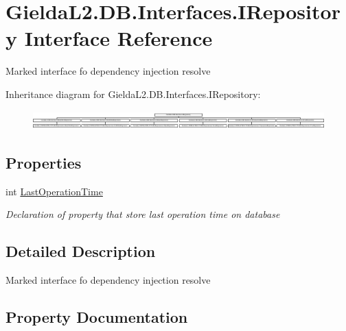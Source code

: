 \hypertarget{interface_gielda_l2_1_1_d_b_1_1_interfaces_1_1_i_repository}{}\section{Gielda\+L2.\+D\+B.\+Interfaces.\+I\+Repository Interface Reference}
\label{interface_gielda_l2_1_1_d_b_1_1_interfaces_1_1_i_repository}


Marked interface fo dependency injection resolve  


Inheritance diagram for Gielda\+L2.\+D\+B.\+Interfaces.\+I\+Repository\+:\begin{figure}[H]
\begin{center}
\leavevmode
\includegraphics[height=0.727273cm]{interface_gielda_l2_1_1_d_b_1_1_interfaces_1_1_i_repository}
\end{center}
\end{figure}
\subsection*{Properties}
\begin{DoxyCompactItemize}
\item 
int \mbox{\hyperlink{interface_gielda_l2_1_1_d_b_1_1_interfaces_1_1_i_repository_a120a6c5450f50d5453bd42decc0640c6}{Last\+Operation\+Time}}
\begin{DoxyCompactList}\small\item\em Declaration of property that store last operation time on database \end{DoxyCompactList}\end{DoxyCompactItemize}


\subsection{Detailed Description}
Marked interface fo dependency injection resolve 



\subsection{Property Documentation}
\mbox{\label{interface_gielda_l2_1_1_d_b_1_1_interfaces_1_1_i_repository_a120a6c5450f50d5453bd42decc0640c6}} 
